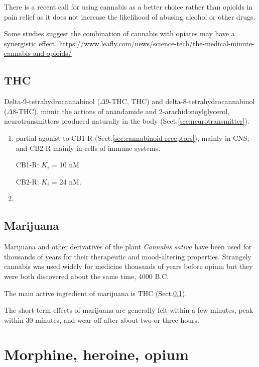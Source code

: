 There is a recent call for using cannabis as a better choice rather than opioids
in pain relief as it does not increase the  likelihood of abusing alcohol or
other drugs.

Some studies suggest the combination of cannabis with opiates may have a
synergistic effect.
\url{https://www.leafly.com/news/science-tech/the-medical-minute-cannabis-and-opioids/}

\subsection{THC}
\label{sec:THC}
 
Delta-9-tetrahydrocannabinol ($\Delta$9-THC, THC) and
delta-8-tetrahydrocannabinol ($\Delta$8-THC), mimic the actions of anandamide
and 2-arachidonoylglycerol, neurotransmitters produced naturally in the body
(Sect.\ref{sec:neurotransmitter}).

\begin{enumerate}
  \item partial agonist to CB1-R (Sect.\ref{sec:cannabinoid-receptors}), mainly
  in CNS; and CB2-R mainly in cells of immune systems.
  
  CB1-R: $K_i$ = 10 nM
  
  CB2-R: $K_i$ = 24 nM.
  
  
  \item 
\end{enumerate}

\subsection{Marijuana}
\label{sec:marijuana}


Marijuana and other derivatives of the plant {\it Cannabis
sativa} have been used for thousands of years for their
therapeutic and mood-altering properties.
Strangely cannabis was used widely for medicine thousands of years before opium
but they were both discovered about the same time, 4000 B.C. 

The main active ingredient of marijuana is THC (Sect.\ref{sec:THC}).

The short-term effects of marijuana are generally felt within a few minutes,
peak within 30 minutes, and wear off after about two or three hours.

\section{Morphine, heroine, opium}

